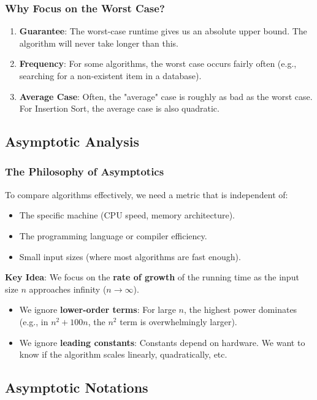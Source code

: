 \documentclass[12pt]{article}
\theoremstyle{blueplain}
\theoremstyle{bluedef}
\theoremstyle{blueremark}
\begin{document}
\subsubsection{Why Focus on the Worst Case?}
\begin{enumerate}
    \item \textbf{Guarantee}: The worst-case runtime gives us an absolute upper bound. The algorithm will never take longer than this.
    \item \textbf{Frequency}: For some algorithms, the worst case occurs fairly often (e.g., searching for a non-existent item in a database).
    \item \textbf{Average Case}: Often, the "average" case is roughly as bad as the worst case. For Insertion Sort, the average case is also quadratic.
\end{enumerate}

\subsection{Asymptotic Analysis}

\subsubsection{The Philosophy of Asymptotics}
To compare algorithms effectively, we need a metric that is independent of:
\begin{itemize}
    \item The specific machine (CPU speed, memory architecture).
    \item The programming language or compiler efficiency.
    \item Small input sizes (where most algorithms are fast enough).
\end{itemize}

\textbf{Key Idea}: We focus on the \textbf{rate of growth} of the running time as the input size $n$ approaches infinity ($n \to \infty$).
\begin{itemize}
    \item We ignore \textbf{lower-order terms}: For large $n$, the highest power dominates (e.g., in $n^2 + 100n$, the $n^2$ term is overwhelmingly larger).
    \item We ignore \textbf{leading constants}: Constants depend on hardware. We want to know if the algorithm scales linearly, quadratically, etc.
\end{itemize}

\subsection{Asymptotic Notations}
\end{document}
